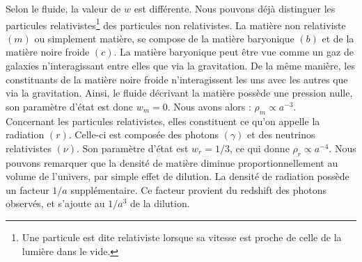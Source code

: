 Selon le fluide, la valeur de $w$ est différente. Nous pouvons déjà distinguer les particules relativistes\footnote{Une particule est dite relativiste lorsque sa vitesse est proche de celle de la lumière dans le vide.} des particules non relativistes. La matière non relativiste $(m)$ ou simplement matière, se compose de la matière baryonique $(b)$ et de la matière noire froide $(c)$.
La matière baryonique peut être vue comme un gaz de galaxies n'interagissant entre elles  que via la gravitation.
De la même manière, les constituants de la matière noire froide n'interagissent les uns avec les autres que via la gravitation.
Ainsi, le fluide décrivant la matière possède une pression nulle, son paramètre d'état est donc $w_m = 0$. Nous avons alors : $\rho_m \propto a^{-3}$. \\
Concernant les particules relativistes, elles constituent ce qu'on appelle la radiation $(r)$. Celle-ci est composée  des photons $(\gamma)$ et des neutrinos relativistes $(\nu)$. Son paramètre d'état est $w_r = 1/3$, ce qui donne $\rho_r \propto a^{-4}$. Nous pouvons remarquer que la densité de matière diminue proportionnellement au volume de l'univers, par simple effet de dilution. La densité de radiation possède un facteur $1/a$ supplémentaire. Ce facteur provient du redshift des photons observés, et s'ajoute au $1/a^3$ de la dilution.

